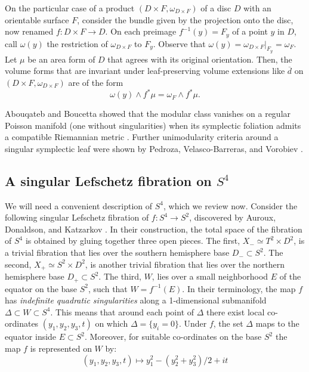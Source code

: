 \documentclass{amsart}
\begin{document}
On the particular case of a product $(D\times F, \omega_{D\times F})$ of a disc $D$ with an orientable surface $F$, consider the bundle given by the projection onto the disc, now renamed $f: D\times F \to D$. On each preimage $f^{-1}(y)=F_{y}$ of a point $y$ in $D$, call $\omega(y)$ the restriction of $\omega_{D\times F}$ to $F_{y}$. Observe that $\omega(y)= \omega_{D\times F}|_{F_{y}} =  \omega_{F}$. Let $\mu$ be an area form of $D$ that agrees with its original orientation. Then, the volume forms that are invariant under leaf-preserving volume extensions like $\overline{d}$ on $(D\times F, \omega_{D\times F})$ are of the form 
%
\begin{equation}\label{eqn:inv-dens}
\omega(y)\wedge f^{*}\mu = \omega_{F} \wedge f^{*}\mu.
\end{equation}

Abouqateb and Boucetta showed that the modular class vanishes on a regular Poisson manifold (one without singularities) when its symplectic foliation admits a compatible Riemannian metric \cite{AB03}.
Further unimodularity criteria around a singular symplectic leaf were shown by Pedroza, Velasco-Barreras, and Vorobiev \cite{PVV18}.


\subsection*{A singular Lefschetz fibration on $S^4$}

We will need a convenient description of $S^4$, which we review now.
Consider the following singular Lefschetz fibration of $f:S^4\to S^2$, discovered by Auroux, Donaldson, and Katzarkov \cite{ADK05}. 
In their construction, the total space of the fibration of $S^4$ is obtained by gluing together three open pieces. 
The first, $X_{-}\simeq T^2\times D^2$, is a trivial fibration that lies over the southern hemisphere base $D_{-}\subset S^2$. 
The second, $X_{+}\simeq S^2\times D^2$, is another trivial fibration that lies over the northern hemisphere base $D_{+}\subset S^2$. 
The third, $W$, lies over a small neighborhood $E$ of the equator on the base $S^2$, such that $W=f^{-1}(E)$. 
In their terminology, the map $f$ has {\it indefinite quadratic singularities} along a 1-dimensional submanifold $\Delta \subset W\subset S^4$. 
This means that around each point of $\Delta$ there exist local co-ordinates $(y_1, y_2, y_3, t)$ on which $\Delta = \{ y_{i}=0 \}$. 
Under $f$, the set $\Delta $ maps to the equator inside $E\subset S^2$.
Moreover, for suitable co-ordinates on the base $S^2$ the map $f$ is represented on $W$ by:
 \begin{equation}\label{eqn:f-on-W}
 (y_1, y_2, y_3, t) \mapsto y_1^2 - (y_2^2 + y_3^2)/2 +it
 \end{equation}
  
\end{document}
